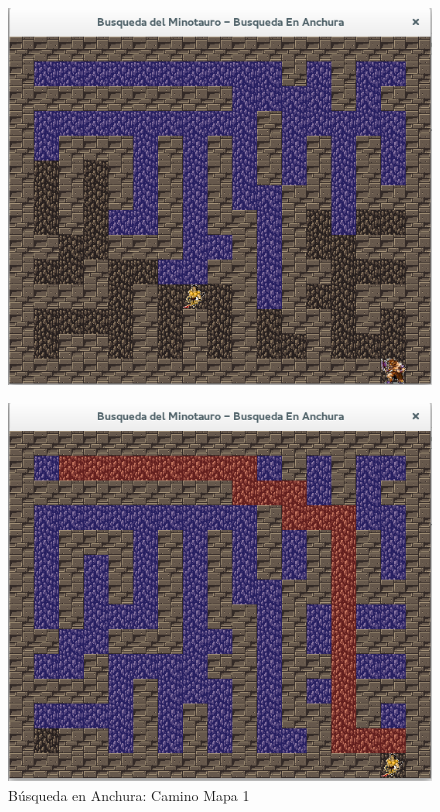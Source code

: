 \documentclass[letter, titlepage, 10pt]{article}
\begin{document}
\begin{appendices}
\begin{figure}[H]
\begin{minipage}{.5\textwidth}
        \includegraphics[width=\linewidth]{images/bea_02}
    \end{minipage}
\end{figure}

\begin{figure}[H]
    \begin{center}
        \includegraphics[scale = 0.4]{images/bea_03}
        \caption{Búsqueda en Anchura: Camino Mapa 1}
    \end{center}
\end{figure}


\end{appendices}
\end{document}

